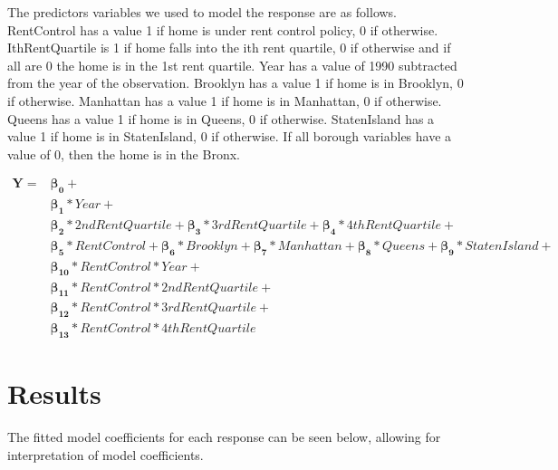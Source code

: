 \documentclass[11pt]{asaproc}\usepackage[]{graphicx}\usepackage[]{color}
\begin{document}
The predictors variables we used to model the response are as follows. RentControl has a value 1 if home is under rent control policy, 0 if otherwise. IthRentQuartile is 1 if home falls into the ith rent quartile, 0 if otherwise and if all are 0 the home is in the 1st rent quartile. Year has a value of 1990 subtracted from the year of the observation. Brooklyn has a value 1 if home is in Brooklyn, 0 if otherwise. Manhattan has a value 1 if home is in Manhattan, 0 if otherwise. Queens has a value 1 if home is in Queens, 0 if otherwise. StatenIsland has a value 1 if home is in StatenIsland, 0 if otherwise. If all borough variables have a value of 0, then the home is in the Bronx.

\begin{align*}
\mathbf{Y} = &\boldsymbol{\beta_0}+\\
&\boldsymbol{\beta_1}*Year+\\
&\boldsymbol{\beta_2}*2ndRentQuartile+
\boldsymbol{\beta_3}*3rdRentQuartile+
\boldsymbol{\beta_4}*4thRentQuartile+\\
&\boldsymbol{\beta_5}*RentControl+
\boldsymbol{\beta_6}*Brooklyn+
\boldsymbol{\beta_7}*Manhattan+
\boldsymbol{\beta_8}*Queens+
\boldsymbol{\beta_9}*StatenIsland+\\
&\boldsymbol{\beta_{10}}*RentControl*Year+\\
&\boldsymbol{\beta_{11}}*RentControl*2ndRentQuartile+\\
&\boldsymbol{\beta_{12}}*RentControl*3rdRentQuartile+\\
&\boldsymbol{\beta_{13}}*RentControl*4thRentQuartile
\end{align*}

\section{Results\label{results}}
The fitted model coefficients for each response can be seen below, allowing for interpretation of model coefficients.
\end{document}
